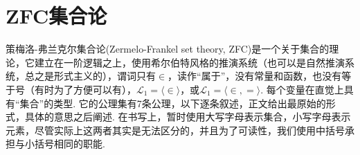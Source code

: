 \section{\textsf{ZFC}集合论}

策梅洛-弗兰克尔集合论(Zermelo-Frankel set theory, \textsf{ZFC})是一个关于集合的理论，它建立在一阶逻辑之上，使用希尔伯特风格的推演系统（也可以是自然推演系统，总之是形式主义的），谓词只有\(\in\)，读作“属于”，没有常量和函数，也没有等于号（有时为了方便可以有），\(\mathcal{L}_1 = \langle \in \rangle\)，或\(\mathcal{L}_1 = \langle \in,= \rangle\). 每个变量在直觉上具有“集合”的类型. 它的公理集有7条公理，以下逐条叙述，正文给出最原始的形式，具体的意思之后阐述. 在书写上，暂时使用大写字母表示集合，小写字母表示元素，尽管实际上这两者其实是无法区分的，并且为了可读性，我们使用中括号承担与小括号相同的职能.

